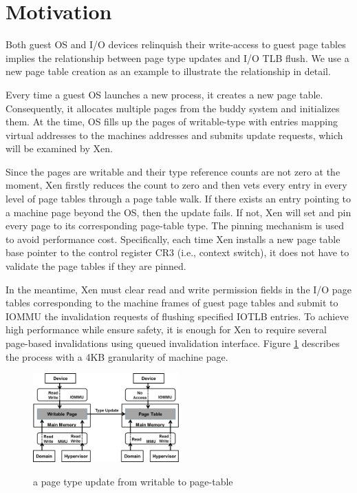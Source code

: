 \section{Motivation}

Both guest OS and I/O devices relinquish their write-access to guest page tables implies the relationship between page type updates and I/O TLB flush. We use a new page table creation as an example to illustrate the relationship in detail.

Every time a guest OS launches a new process, it creates a new page table. Consequently, it allocates multiple pages from the buddy system and initializes them. At the time, OS fills up the pages of writable-type with entries mapping virtual addresses to the machines addresses and submits update requests, which will be examined by Xen.

Since the pages are writable and their type reference counts are not zero at the moment, Xen firstly reduces the count to zero and then vets every entry in every level of page tables through a page table walk. If there exists an entry pointing to a machine page beyond the OS, then the update fails. If not, Xen will set and pin every page to its corresponding page-table type. The pinning mechanism is used to avoid performance cost. Specifically, each time Xen installs a new page table base pointer to the control register CR3 (i.e., context switch), it does not have to validate the page tables if they are pinned.

In the meantime, Xen must clear read and write permission fields in the I/O page tables corresponding to the machine frames of guest page tables and submit to IOMMU the invalidation requests of flushing specified IOTLB entries. To achieve high performance while ensure safety, it is enough for Xen to require several page-based invalidations using queued invalidation interface. Figure \ref{fig:wr2pt} describes the process with a 4KB granularity of machine page.  

\begin{figure}[ht]
\centering
\includegraphics[width=0.5\textwidth]{image/translation/wr2pt.png} \\
\caption{a page type update from writable to page-table}
\label{fig:wr2pt}
\end{figure}

